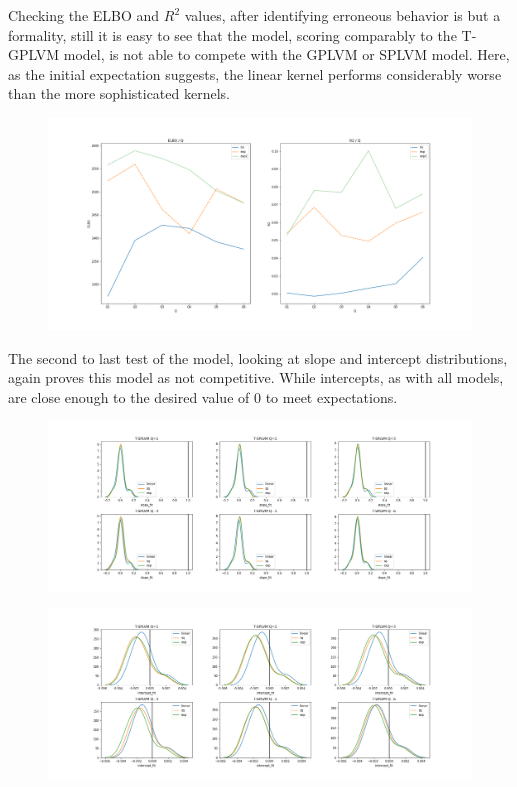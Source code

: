 Checking the ELBO and $R^2$ values, after identifying erroneous behavior is but a formality, still it is easy to see that the model, scoring comparably to the T-GPLVM model, is not able to compete with the GPLVM or SPLVM model. Here, as the initial expectation suggests, the linear kernel performs considerably worse than the more sophisticated kernels. 
\begin{figure}
	\centering
	\includegraphics[width=7in]{img/07_4/modelTIMET_Qs.png}
	\caption[]{}
	\label{fig:tsplvm_ELBO_R2}
\end{figure}
The second to last test of the model, looking at slope and intercept distributions, again proves this model as not competitive. While intercepts, as with all models, are close enough to the desired value of 0 to meet expectations.
\begin{figure}
	\centering
	\includegraphics[width=7in]{img/07_4/slope_fit_timet_elbo.png}
	\caption[]{}
	\label{fig:tsplvm_slopes}
\end{figure}
\begin{figure}
	\centering
	\includegraphics[width=7in]{img/07_4/intercept_fit_timet_elbo.png}
	\caption[]{}
	\label{fig:tsplvm_intercepts}
\end{figure}
